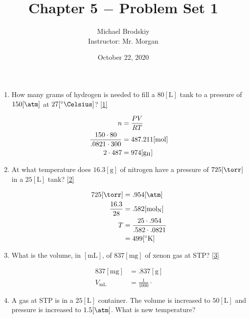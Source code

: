 \documentclass[12pt]{article}
\title{Chapter 5 $-$ Problem Set 1}
\date{October 22, 2020}
\author{Michael Brodskiy\\ \small Instructor: Mr. Morgan}
\begin{document}
\maketitle

\begin{enumerate}

  \item How many grams of hydrogen is needed to fill a $80[\si{\liter}]$ tank to a pressure of $150[\si{\atm}]$ at $27[^{\circ}\si{\Celsius}]$? \eqref{1}

    \begin{equation}
      \begin{split}
        n&=\frac{PV}{RT}\\
        \frac{150\cdot80}{.0821\cdot300}&=487.211[\si{\mole}]\\
        2\cdot487&=974[\si{\gram}_{\ce{H}}]\\
      \end{split}
      \label{1}
    \end{equation}

  \item At what temperature does $16.3[\si{\gram}]$ of nitrogen have a pressure of $725[\si{\torr}]$ in a $25[\si{\liter}]$ tank? \eqref{2}

    \begin{equation}
      \begin{split}
      725[\si{\torr}]&=.954[\si{\atm}]\\
      \frac{16.3}{28}&=.582[\si{\mole}_{\ce{N}}]\\
      T&=\frac{25\cdot.954}{.582\cdot.0821}\\
      &=499[^{\circ}\si{\kelvin}]
    \end{split}
      \label{2}
    \end{equation}

  \item What is the volume, in $[\si{\milli\liter}]$, of $837[\si{\milli\gram}]$ of xenon gas at STP? \eqref{3}

      \begin{equation}
        \begin{split}
          837[\si{\milli\gram}]&=.837[\si{\gram}]\\
          V_{\si{\milli\liter}}&=\frac{1}{1000}\cdot
        \end{split}
        \label{3}
      \end{equation}

    \item A gas at STP is in a $25[\si{\liter}]$ container.  The volume is increased to $50[\si{\liter}]$ and pressure is increased to $1.5[\si{\atm}]$.  What is new temperature?  


\end{enumerate}
\end{document}
